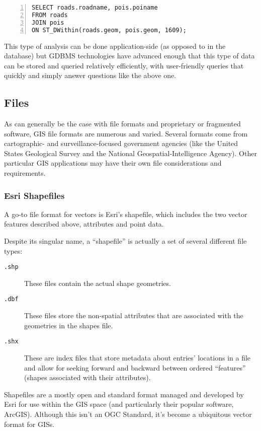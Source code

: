 \begin{Verbatim}[samepage=true,baselinestretch=1,numbers=left,xleftmargin=12mm]
SELECT roads.roadname, pois.poiname
FROM roads
JOIN pois 
ON ST_DWithin(roads.geom, pois.geom, 1609);
\end{Verbatim}

This type of analysis can be done application-side (as opposed to in the database) but GDBMS technologies have advanced enough that this type of data can be stored and queried relatively efficiently, with user-friendly queries that quickly and simply answer questions like the above one.

\subsection{Files}
As can generally be the case with file formats and proprietary or fragmented software, GIS file formats are numerous and varied. Several formats come from cartographic- and surveillance-focused government agencies (like the United States Geological Survey and the National Geospatial-Intelligence Agency). Other particular GIS applications may have their own file considerations and requirements.

\subsubsection{Esri Shapefiles}
A go-to file format for vectors is Esri's shapefile, which includes the two vector features described above, attributes and point data.

Despite its singular name, a ``shapefile'' is actually a set of several different file types:

\begin{description}
  \item[\tt{.shp}] These files contain the actual shape geometries.
  \item[\tt{.dbf}] These files store the non-spatial attributes that are associated with the geometries in the shapes file.
  \item[\tt{.shx}] These are index files that store metadata about entries' locations in a file and allow for seeking forward and backward between ordered ``features'' (shapes associated with their attributes).
\end{description}

Shapefiles are a mostly open and standard format managed and developed by Esri for use within the GIS space (and particularly their popular software, ArcGIS). Although this isn't an OGC Standard, it's become a ubiquitous vector format for GISs.

